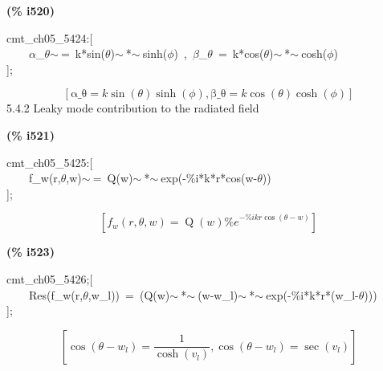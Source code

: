 \documentclass[fleqn]{article}
\begin{document}
\noindent
\begin{minipage}[t]{4.000000em}\color{red}\bfseries
(\% i520)	
\end{minipage}
\begin{minipage}[t]{\textwidth}\color{blue}
cmt\_ch05\_5424:[\\
\ \ \ \ \ensuremath{\alpha}\_\ensuremath{\theta}\ensuremath{\sim\ }=\ k*sin(\ensuremath{\theta})\ensuremath{\sim\ }*\ensuremath{\sim\ }sinh(\ensuremath{\phi})\ ,\ \ensuremath{\beta}\_\ensuremath{\theta}\ =\ k*cos(\ensuremath{\theta})\ensuremath{\sim\ }*\ensuremath{\sim\ }cosh(\ensuremath{\phi})\\
];
\end{minipage}
\[\displaystyle \tag{\% o520} 
\left[ \ensuremath{\mathrm{\alpha \_ \theta }}=k \sin{\left( \theta \right) } \sinh{\left( \phi \right) }\operatorname{,}\ensuremath{\mathrm{\beta \_ \theta }}=k \cos{\left( \theta \right) } \cosh{\left( \phi \right) }\right] \mbox{}
\]
5.4.2 Leaky mode contribution to the radiated field


\noindent
\begin{minipage}[t]{4.000000em}\color{red}\bfseries
(\% i521)	
\end{minipage}
\begin{minipage}[t]{\textwidth}\color{blue}
cmt\_ch05\_5425:[\\
\ \ \ \ f\_w(r,\ensuremath{\theta},w)\ensuremath{\sim\ }=\ Q(w)\ensuremath{\sim\ }*\ensuremath{\sim\ }exp(-\%i*k*r*cos(w-\ensuremath{\theta}))\\
];
\end{minipage}
\[\displaystyle \tag{\% o521} 
\left[ {f_w}\left( r\operatorname{,}\theta \operatorname{,}w\right) =\operatorname{Q}(w) {{\% e}^{-\% i k r \cos{\left( \theta -w\right) }}}\right] \mbox{}
\]


\noindent
\begin{minipage}[t]{4.000000em}\color{red}\bfseries
(\% i523)	
\end{minipage}
\begin{minipage}[t]{\textwidth}\color{blue}
cmt\_ch05\_5426;[\\
\ \ \ \ Res(f\_w(r,\ensuremath{\theta},w\_l))\ =\ (Q(w)\ensuremath{\sim\ }*\ensuremath{\sim\ }(w-w\_l)\ensuremath{\sim\ }*\ensuremath{\sim\ }exp(-\%i*k*r*(w\_l-\ensuremath{\theta})))\ \\
];
\end{minipage}
\[\displaystyle \tag{\% o522} 
\left[ \cos{\left( \theta -{w_l}\right) }=\frac{1}{\cosh{\left( {v_l}\right) }}\operatorname{,}\cos{\left( \theta -{w_l}\right) }=\sec{\left( {v_l}\right) }\right] \mbox{}\]
\end{document}
